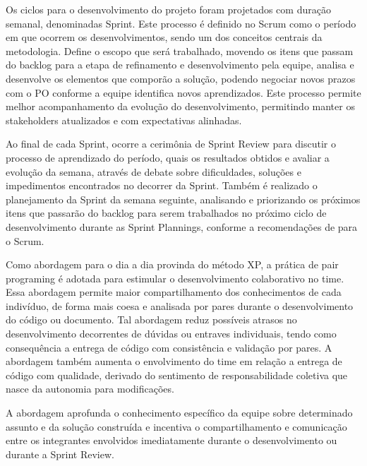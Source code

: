 \documentclass[
    12pt,               %
    openright,          %
    oneside,
    a4paper,            %
    BIBLATEX,           %
    TODO,               %
    english,            %
    brazil              %
    ]{ifsp-spo-inf-ctds}
\begin{document}
        Os ciclos para o desenvolvimento do projeto foram projetados com duração semanal, denominadas Sprint. Este processo é definido no Scrum como o período em que ocorrem os desenvolvimentos, sendo um dos conceitos centrais da metodologia. Define o escopo que será trabalhado, movendo os itens que passam do backlog para a etapa de refinamento e desenvolvimento pela equipe, analisa e desenvolve os elementos que comporão a solução, podendo negociar novos prazos com o PO conforme a equipe identifica novos aprendizados\cite{scrum}. Este processo permite melhor acompanhamento da evolução do desenvolvimento, permitindo manter os stakeholders atualizados e com expectativas alinhadas.
        
        Ao final de cada Sprint, ocorre a cerimônia de Sprint Review para discutir o processo de aprendizado do período, quais os resultados obtidos e avaliar a evolução da semana, através de debate sobre dificuldades, soluções e impedimentos encontrados no decorrer da Sprint. Também é realizado o planejamento da Sprint da semana seguinte, analisando e priorizando os próximos itens que passarão do backlog para serem trabalhados no próximo ciclo de desenvolvimento durante as Sprint Plannings, conforme a recomendações de  para o Scrum.
        
        Como abordagem para o dia a dia provinda do método XP, a prática de pair programing é adotada para estimular o desenvolvimento colaborativo no time. Essa abordagem permite maior compartilhamento dos conhecimentos de cada indivíduo, de forma mais coesa e analisada por pares durante o desenvolvimento do código ou documento. Tal abordagem reduz possíveis atrasos no desenvolvimento decorrentes de dúvidas ou entraves individuais, tendo como consequência a entrega de código com consistência e validação por pares. A abordagem também aumenta o envolvimento do time em relação a entrega de código com qualidade, derivado do sentimento de responsabilidade coletiva que nasce da autonomia para modificações\cite{agile}.

        A abordagem aprofunda o conhecimento específico da equipe sobre determinado assunto e da solução construída e incentiva o compartilhamento e comunicação entre os integrantes envolvidos imediatamente durante o desenvolvimento ou durante a Sprint Review.
        
\end{document}
